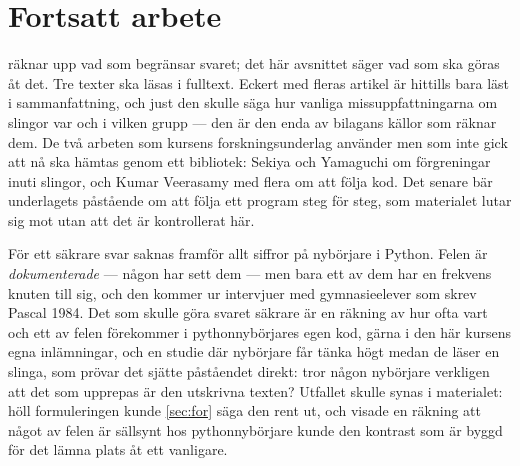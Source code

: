 \section{Fortsatt arbete}
\label{sec:miss-fortsatt}

 räknar upp vad som begränsar svaret; det här
avsnittet säger vad som ska göras åt det.  Tre texter ska läsas i
fulltext.  Eckert med fleras artikel är hittills bara läst i
sammanfattning\autocite{Eckert2022Loops}, och just den skulle säga hur
vanliga missuppfattningarna om slingor var och i vilken grupp --- den
är den enda av bilagans källor som räknar dem.  De två arbeten som
kursens forskningsunderlag använder men som inte gick att nå ska hämtas
genom ett bibliotek: Sekiya och Yamaguchi om förgreningar inuti slingor,
och Kumar Veerasamy med flera om att följa kod.  Det senare bär
underlagets påstående om att följa ett program steg för steg, som
materialet lutar sig mot utan att det är kontrollerat här.

För ett säkrare svar saknas framför allt siffror på nybörjare i Python.
Felen är \emph{dokumenterade} --- någon har sett dem --- men bara ett av
dem har en frekvens knuten till sig, och den kommer ur intervjuer med
gymnasieelever som skrev Pascal 1984.  Det som skulle göra svaret
säkrare är en räkning av hur ofta vart och ett av felen förekommer i
pythonnybörjares egen kod, gärna i den här kursens egna inlämningar, och
en studie där nybörjare får tänka högt medan de läser en slinga, som
prövar det sjätte påståendet direkt: tror någon nybörjare verkligen att
det som upprepas är den utskrivna texten?  Utfallet skulle synas i
materialet: höll formuleringen kunde \cref{sec:for} säga den rent ut, och
visade en räkning att något av felen är sällsynt hos pythonnybörjare
kunde den kontrast som är byggd för det lämna plats åt ett vanligare.
